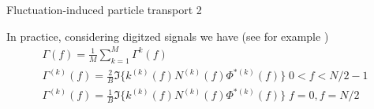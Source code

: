 \documentclass[t,10pt]{beamer}
\begin{document}
\begin{frame}{Fluctuation-induced particle transport 2}
\begin{itemize}
{\footnotesize
\item In practice, considering digitzed signals we have
  \footnotesize{(see for example \parencite{Antoni:2000bn})}
\begin{gather*}
\Gamma(f)=\frac{1}{M}\sum_{k=1}^{M}\Gamma^{k}(f) \\
\Gamma^{(k)}(f)=\frac{2}{B}\Im\{k^{(k)}(f)N^{(k)}(f)\Phi^{*(k)}(f)\}
 \;0<f<N/2-1 \\
\Gamma^{(k)}(f)=\frac{1}{B}\Im\{k^{(k)}(f)N^{(k)}(f)\Phi^{*(k)}(f)\}
 \;f=0,f=N/2
\end{gather*}
}


\end{itemize}
\end{frame}
\end{document}
